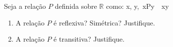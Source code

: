 \item Seja a relação $P$ definida sobre
$\mathbb{R}$ como:
\ben x, y\in {},\ xPy\ \Leftrightarrow\ xy \een

\begin{enumerate}
\item A relação $P$ é reflexiva? Simétrica? Justifique.
\item A relação $P$ é transitiva? Justifique.
\end{enumerate}

